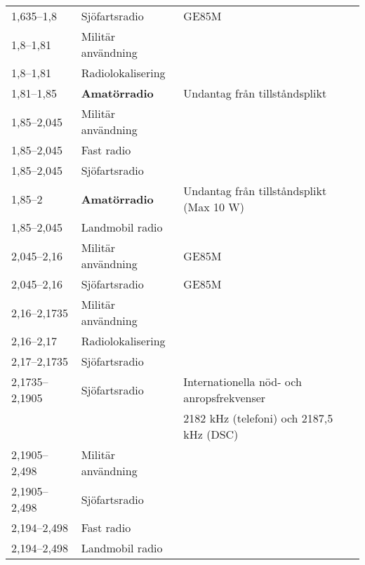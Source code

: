 \begin{landscape}
\begin{longtable}{lll}
1,635--1,8	 & Sjöfartsradio                   & GE85M                                     \\
1,8--1,81	 & Militär användning              &                                           \\ 
1,8--1,81	 & Radiolokalisering               &                                           \\
1,81--1,85	 & \textbf{Amatörradio}            & Undantag från tillståndsplikt             \\
1,85--2,045	 & Militär användning              &                                           \\
1,85--2,045	 & Fast radio                      &                                           \\
1,85--2,045	 & Sjöfartsradio                   &                                           \\
1,85--2	 	 & \textbf{Amatörradio}            & Undantag från tillståndsplikt (Max 10 W)  \\
1,85--2,045	 & Landmobil radio                 &                                           \\
2,045--2,16	 & Militär användning              & GE85M                                     \\
2,045--2,16	 & Sjöfartsradio                   & GE85M                                     \\
2,16--2,1735	 & Militär användning              &                                           \\	 
2,16--2,17	 & Radiolokalisering               &                                           \\	 
2,17--2,1735	 & Sjöfartsradio                   &                                           \\
2,1735--2,1905	 & Sjöfartsradio                   & Internationella nöd- och anropsfrekvenser \\
                 &                                 & 2182 kHz (telefoni) och 2187,5 kHz (DSC)  \\
2,1905--2,498	 & Militär användning              &                                           \\	 
2,1905--2,498	 & Sjöfartsradio                   &                                           \\
2,194--2,498	 & Fast radio                      &                                           \\
2,194--2,498	 & Landmobil radio                 &                                           \\	 

\end{longtable}
\end{landscape}
